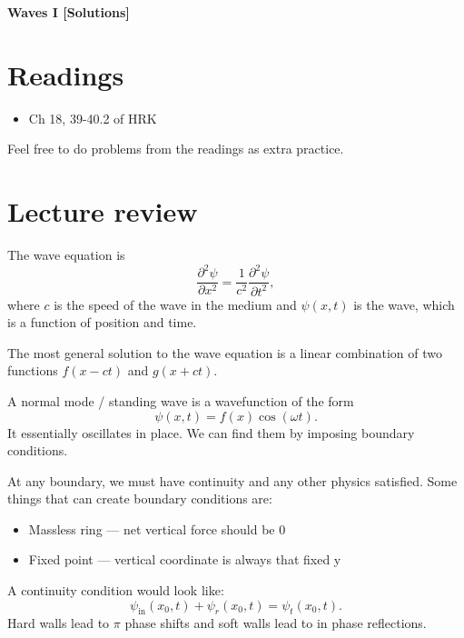 \documentclass[11pt]{scrartcl}
\title{\titlee}
\author{Cambridge Physics Academy}
\date{2023-2024}
\newcommand{\titlee}{Waves I [Solutions]}
\begin{document}
\thispagestyle{empty}
\begin{center}
    
    
    \Huge \textbf{\textsf{\titlee}}

    \large \theauthor
\end{center}

\setcounter{section}{-1}
\section{Readings}
\begin{itemize}
    \item Ch 18, 39-40.2 of HRK
\end{itemize}
Feel free to do problems from the readings as extra practice.


\section{Lecture review}

\begin{defn}
    The wave equation is
    $$\frac{\partial^2 \psi}{\partial x^2} = \frac{1}{c^2}\frac{\partial^2 \psi}{\partial t^2},$$
    where $c$ is the speed of the wave in the medium and $\psi(x,t)$ is the wave, which is a function of position and time.
\end{defn}

\begin{theorem}
    The most general solution to the wave equation is a linear combination of two functions $f(x-ct)$ and $g(x+ct)$.
\end{theorem}

\begin{defn}
    A normal mode / standing wave is a wavefunction of the form
    $$\psi (x,t) = f(x) \cos (\omega t).$$
    It essentially oscillates in place. We can find them by imposing boundary conditions.
\end{defn}

\begin{idea}
    At any boundary, we must have continuity and any other physics satisfied. Some things that can create boundary conditions are:
    \begin{itemize}
        \item Massless ring — net vertical force should be 0
        \item Fixed point — vertical coordinate is always that fixed y
    \end{itemize}
    A continuity condition would look like:
    $$\psi_{\text{in}}(x_0,t) + \psi_r(x_0,t) = \psi_t(x_0,t).$$
    Hard walls lead to $\pi$ phase shifts and soft walls lead to in phase reflections.
\end{idea}
\end{document}
